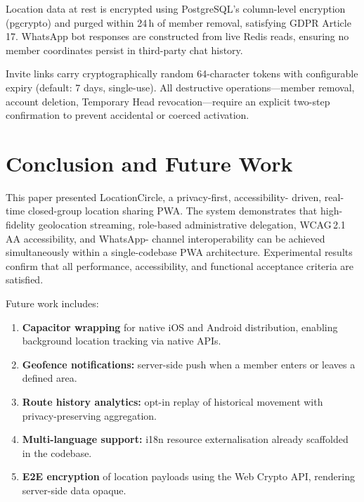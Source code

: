 \documentclass[conference]{IEEEtran}
\begin{document}
Location data at rest is encrypted using PostgreSQL's column-level
encryption (pgcrypto) and purged within 24\,h of member removal,
satisfying GDPR Article\,17. WhatsApp bot responses are constructed
from live Redis reads, ensuring no member coordinates persist in
third-party chat history.

Invite links carry cryptographically random 64-character tokens
with configurable expiry (default: 7 days, single-use). All
destructive operations—member removal, account deletion, Temporary
Head revocation—require an explicit two-step confirmation to prevent
accidental or coerced activation.

\section{Conclusion and Future Work}
\label{sec:conc}

This paper presented LocationCircle, a privacy-first, accessibility-
driven, real-time closed-group location sharing PWA. The system
demonstrates that high-fidelity geolocation streaming, role-based
administrative delegation, WCAG\,2.1\,AA accessibility, and WhatsApp-
channel interoperability can be achieved simultaneously within a
single-codebase PWA architecture. Experimental results confirm that
all performance, accessibility, and functional acceptance criteria
are satisfied.

Future work includes:
\begin{enumerate}
  \item \textbf{Capacitor wrapping} for native iOS and Android
        distribution, enabling background location tracking via
        native APIs.
  \item \textbf{Geofence notifications:} server-side push when a
        member enters or leaves a defined area.
  \item \textbf{Route history analytics:} opt-in replay of historical
        movement with privacy-preserving aggregation.
  \item \textbf{Multi-language support:} i18n resource externalisation
        already scaffolded in the codebase.
  \item \textbf{E2E encryption} of location payloads using the Web
        Crypto API, rendering server-side data opaque.
\end{enumerate}
\end{document}
